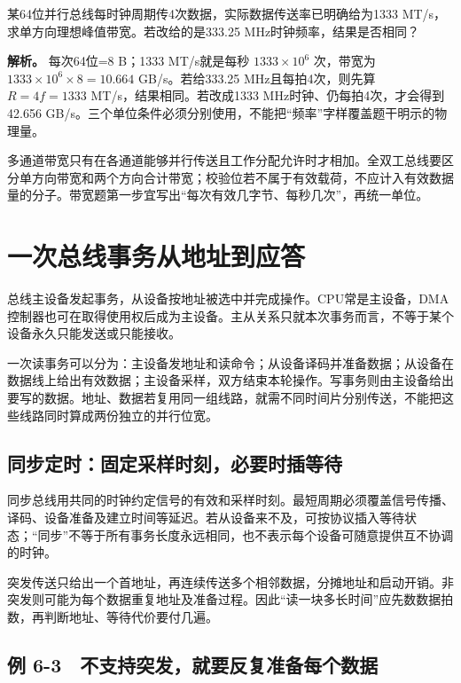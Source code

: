 \begin{example}[自拟数值例]

某64位并行总线每时钟周期传4次数据，实际数据传送率已明确给为1333 MT/s，求单方向理想峰值带宽。若改给的是333.25 MHz时钟频率，结果是否相同？

\end{example}

\textbf{解析。} 每次64位=8 B；1333 MT/s就是每秒 \(1333\times10^6\) 次，带宽为 \(1333\times10^6\times8=10.664\) GB/s。若给333.25 MHz且每拍4次，则先算 \(R=4f=1333\) MT/s，结果相同。若改成1333 MHz时钟、仍每拍4次，才会得到42.656 GB/s。三个单位条件必须分别使用，不能把``频率''字样覆盖题干明示的物理量。

多通道带宽只有在各通道能够并行传送且工作分配允许时才相加。全双工总线要区分单方向带宽和两个方向合计带宽；校验位若不属于有效载荷，不应计入有效数据量的分子。带宽题第一步宜写出``每次有效几字节、每秒几次''，再统一单位。

\section{一次总线事务从地址到应答}\label{CO06-transaction}

总线主设备发起事务，从设备按地址被选中并完成操作。CPU常是主设备，DMA控制器也可在取得使用权后成为主设备。主从关系只就本次事务而言，不等于某个设备永久只能发送或只能接收。

一次读事务可以分为：主设备发地址和读命令；从设备译码并准备数据；从设备在数据线上给出有效数据；主设备采样，双方结束本轮操作。写事务则由主设备给出要写的数据。地址、数据若复用同一组线路，就需不同时间片分别传送，不能把这些线路同时算成两份独立的并行位宽。

\subsection{同步定时：固定采样时刻，必要时插等待}\label{CO06-sync}

同步总线用共同的时钟约定信号的有效和采样时刻。最短周期必须覆盖信号传播、译码、设备准备及建立时间等延迟。若从设备来不及，可按协议插入等待状态；``同步''不等于所有事务长度永远相同，也不表示每个设备可随意提供互不协调的时钟。

突发传送只给出一个首地址，再连续传送多个相邻数据，分摊地址和启动开销。非突发则可能为每个数据重复地址及准备过程。因此``读一块多长时间''应先数数据拍数，再判断地址、等待代价要付几遍。

\subsection{例 6-3　不支持突发，就要反复准备每个数据}\label{CO06-example-3}

